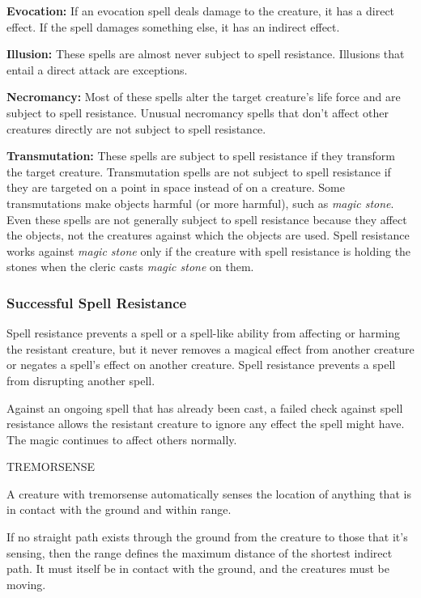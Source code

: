 \documentclass{article}
\begin{document}
\textbf{Evocation:} If an evocation spell deals damage to the creature, it has 
a direct effect. If the spell damages something else, it has an indirect effect.

\textbf{Illusion: }These spells are almost never subject to spell resistance. Illusions 
that entail a direct attack are exceptions.

\textbf{Necromancy:} Most of these spells alter the target creature's life force 
and are subject to spell resistance. Unusual necromancy spells that don't affect 
other creatures directly are not subject to spell resistance.

\textbf{Transmutation:} These spells are subject to spell resistance if they transform 
the target creature. Transmutation spells are not subject to spell resistance if 
they are targeted on a point in space instead of on a creature. Some transmutations 
make objects harmful (or more harmful), such as \textit{magic stone}. Even these 
spells are not generally subject to spell resistance because they affect the objects, 
not the creatures against which the objects are used. Spell resistance works against 
\textit{magic stone }only if the creature with spell resistance is holding the 
stones when the cleric casts \textit{magic stone }on them. 

\subsubsection*{\textbf{Successful Spell Resistance}}

Spell resistance prevents a spell or a spell-like ability from affecting or harming 
the resistant creature, but it never removes a magical effect from another creature 
or negates a spell's effect on another creature. Spell resistance prevents a spell 
from disrupting another spell.

Against an ongoing spell that has already been cast, a failed check against spell 
resistance allows the resistant creature to ignore any effect the spell might have. 
The magic continues to affect others normally.

\vspace{12pt}
TREMORSENSE

A creature with tremorsense automatically senses the location of anything that 
is in contact with the ground and within range.

If no straight path exists through the ground from the creature to those that it's 
sensing, then the range defines the maximum distance of the shortest indirect path. 
It must itself be in contact with the ground, and the creatures must be moving. 
\end{document}
